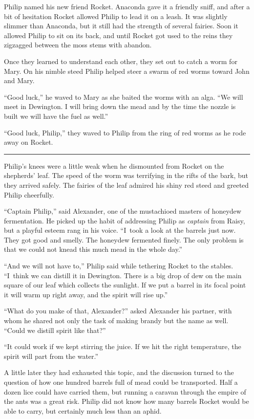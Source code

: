 \documentclass[10pt]{memoir}
\renewcommand{\pfbreakdisplay}{\bigskip \ding{166} \bigskip}
\newcommand{\secbreak}{\fancybreak{\pfbreakdisplay}}
\begin{document}
Philip named his new friend Rocket. Anaconda gave it a friendly sniff, and
after a bit of hesitation Rocket allowed Philip to lead it on a leash. It was
slightly slimmer than Anaconda, but it still had the strength of several
fairies. Soon it allowed Philip to sit on its back, and until Rocket got used
to the reins they zigzagged between the moss stems with abandon.

Once they learned to understand each other, they set out to catch a worm for
Mary. On his nimble steed Philip helped steer a swarm of red worms toward John
and Mary.

``Good luck,'' he waved to Mary as she baited the worms with an alga. ``We will
meet in Dewington. I will bring down the mead and by the time the nozzle is
built we will have the fuel as well.''

``Good luck, Philip,'' they waved to Philip from the ring of red worms as he
rode away on Rocket.

\secbreak

Philip's knees were a little weak when he dismounted from Rocket on the
shepherds' leaf. The speed of the worm was terrifying in the rifts of the bark,
but they arrived safely. The fairies of the leaf admired his shiny red steed
and greeted Philip cheerfully.

``Captain Philip,'' said Alexander, one of the mustachioed masters of honeydew
fermentation. He picked up the habit of addressing Philip as \textit{captain}
from Raisy, but a playful esteem rang in his voice. ``I~took a look at the
barrels just now. They got good and smelly. The honeydew fermented finely. The
only problem is that we could not knead this much mead in the whole day.''

``And we will not have to,'' Philip said while tethering Rocket to the stables.
``I~think we can distill it in Dewington. There is a big drop of dew on the
main square of our leaf which collects the sunlight. If we put a barrel in its
focal point it will warm up right away, and the spirit will rise up.''

``What do you make of that, Alexander?'' asked Alexander his partner, with whom
he shared not only the task of making brandy but the name as well. ``Could we
distill spirit like that?''

``It could work if we kept stirring the juice. If we hit the right temperature,
the spirit will part from the water.''

A little later they had exhausted this topic, and the discussion turned to the
question of how one hundred barrels full of mead could be transported. Half a
dozen lice could have carried them, but running a caravan through the empire of
the ants was a great risk. Philip did not know how many barrels Rocket would be
able to carry, but certainly much less than an aphid.
\end{document}
